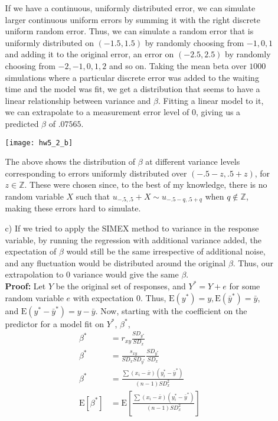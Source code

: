 \documentclass[11pt]{article}
\newcommand{\Z}{\mathbb{Z}}
\newcommand{\E}{\mathrm{E}}
\theoremstyle{definition}
\begin{document}
\begin{itemize}
\begin{itemize}
                If we have a continuous, uniformly distributed error, we can simulate larger continuous uniform errors by summing it with the right discrete uniform random error. Thus, we can simulate a random error that is uniformly distributed on $(-1.5,1.5)$ by randomly choosing from ${-1,0,1}$ and adding it to the original error, an error on $(-2.5,2.5)$ by randomly choosing from ${-2,-1,0,1,2}$ and so on. Taking the mean beta over $1000$ simulations where a particular discrete error was added to the waiting time and the model was fit, we get a distribution that seems to have a linear relationship between variance and $\beta$. Fitting a linear model to it, we can extrapolate to a measurement error level of $0$, giving us a predicted $\beta$ of $.07565$.
                \begin{center}
                    \texttt{[image: hw5\_2\_b]}
                \end{center}
                The above shows the distribution of $\beta$ at different variance levels corresponding to errors uniformly distributed over $(-.5-z,.5+z)$, for $z\in\Z$. These were chosen since, to the best of my knowledge, there is no random variable $X$ such that \(u_{-.5,.5}+X \sim u_{-.5-q,.5+q}\) when $q\not\in\Z$, making these errors hard to simulate.
            \item[c)] If we tried to apply the SIMEX method to variance in the response variable, by running the regression with additional variance added, the expectation of $\beta$ would still be the same irrespective of additional noise, and any fluctuation would be distributed around the original $\beta$. Thus, our extrapolation to $0$ variance would give the same $\beta$. \\
                {\bf Proof:} Let $Y$ be the original set of responses, and $Y^*=Y+e$ for some random variable $e$ with expectation $0$. Thus, \(\E(y^*)=y,\E(\bar y^*) = \bar y\), and \(\E(y^*-\bar y^*) = y -\bar y\). Now, starting with the coefficient on the predictor for a model fit on $Y^*$, $\beta^*$,
                \begin{align*}
                    \beta^* &= r_{xy}\frac{SD_{y^*}}{SD_x} \\
                    \beta^* &= \frac{s_{xy}}{SD_x SD_{y^*}}\frac{SD_{y^*}}{SD_x} \\
                    \beta^* &= \frac{\sum(x_i-\bar x)(y_i^*-\bar y^*)}{(n-1)SD_x^2}\\
                    \E[\beta^*] &= \E\left[\frac{\sum(x_i-\bar x)(y_i^*-\bar y^*)}{(n-1)SD_x^2}\right] \\

\end{align*}
\end{itemize}
\end{itemize}
\end{document}
